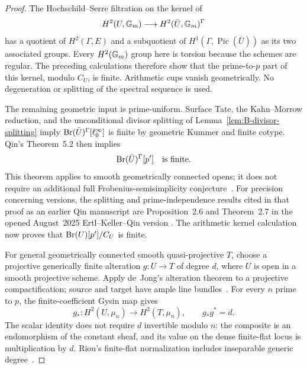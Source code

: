 \begin{proof}
The Hochschild--Serre filtration on the kernel of
\[
 H^2(U,{\mathbb G_m})\longrightarrow H^2(\bar U,{\mathbb G_m})^\Gamma
\]
has a quotient of \(H^2(\Gamma,E)\) and a subquotient of
\(H^1(\Gamma,\operatorname{Pic}(\bar U))\) as its two
associated groups.  Every \(H^2({\mathbb G_m})\) group here is torsion
because the schemes are regular.  The preceding calculations
therefore show that the prime-to-\(p\) part of this kernel,
modulo \(C_U\), is finite.  Arithmetic cups vanish geometrically.
No degeneration or splitting of the spectral sequence is used.

The remaining geometric input is prime-uniform.  Surface Tate,
the Kahn--Morrow reduction, and the unconditional divisor
splitting of Lemma~\ref{lem:B-divisor-splitting} imply
\(\operatorname{Br}(\bar U)^\Gamma[\ell_0^\infty]\) is finite by
geometric Kummer and finite cotype.  Qin's Theorem~5.2 then
implies
\[
                 \operatorname{Br}(\bar U)^\Gamma[p']\quad\text{is finite}.
\]
This theorem applies to smooth geometrically connected opens;
it does not require an additional full Frobenius-semisimplicity
conjecture~\cite[Theorem~5.2 and its proof in
Lemmas~3.2--3.4, Propositions~4.2--4.3, and Theorem~4.4]
{BQin2021Uniform}.
For precision concerning versions, the splitting and
prime-independence results cited in that proof as an earlier
Qin manuscript are Proposition~2.6 and Theorem~2.7 in the
opened August~2025 Ertl--Keller--Qin version
\cite[Proposition~2.6 and Theorem~2.7]{BErtlKellerQin2025}.
The arithmetic kernel calculation now proves that
\(\operatorname{Br}(U)[p']/C_U\) is finite.

For general geometrically connected smooth quasi-projective
\(T\), choose a projective generically finite alteration
\(g:U\to T\) of degree \(d\), where \(U\) is open in
a smooth projective scheme.  Apply de~Jong's alteration theorem
to a projective compactification; source and target have ample
line bundles~\cite[Theorem~4.1 and Remark~4.2]{c_dejong1996}.
For every \(n\) prime to \(p\), the finite-coefficient Gysin
map gives
\[
 g_*:H^2(U,\mu_n)\longrightarrow H^2(T,\mu_n),
 \qquad g_*g^*=d.
\]
The scalar identity does not require \(d\) invertible modulo
\(n\): the composite is an endomorphism of the constant sheaf,
and its value on the dense finite-flat locus is multiplication
by \(d\).  Riou's finite-flat normalization includes inseparable
generic degree~\cite[Proposition~2.5.13, Remark~2.5.14,
Corollary~3.1.2, and Lemmas~3.5.8--3.5.10]{c_riou2014}.


\end{proof}
